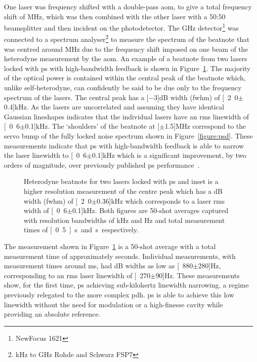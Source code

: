 One laser was frequency shifted with a double-pass \gls{aom}, to give a total frequency shift of \unit[160]{MHz}, which was then combined with the other laser with a 50:50 beamsplitter and then incident on the photodetector.
The \unit[1]{GHz} detector\footnote{NewFocus 1621} was connected to a spectrum analyser\footnote{\unit[9]{kHz} to \unit[7]{GHz} Rohde and Schwarz FSP7} to measure the spectrum of the beatnote that was centred around \unit[160]{MHz} due to the frequency shift imposed on one beam of the heterodyne measurement by the \gls{aom}.
An example of a beatnote from two lasers locked with \gls{ps} with high-bandwidth feedback is shown in Figure~\ref{figure:two_laser_beatnote}.
The majority of the optical power is contained within the central peak of the beatnote which, unlike self-heterodyne, can confidently be said to be due only to the frequency spectrum of the lasers.
The central peak has a \unit[$-3$]{dB} width (\gls{fwhm}) of \unit[2.0$\pm$0.4]{kHz}.
As the lasers are uncorrelated and assuming they have identical Gaussian lineshapes indicates that the individual lasers have an \gls{rms} linewidth of \unit[0.6$\pm$0.1]{kHz}.
The `shoulders' of the beatnote at \unit[$\pm$1.5]{MHz} correspond to the servo bump of the fully locked noise spectrum shown in Figure~\ref{figure:psd}.
These measurements indicate that \gls{ps} with high-bandwidth feedback is able to narrow the laser linewidth to \unit[0.6$\pm$0.1]{kHz} which is a significant improvement, by two orders of magnitude, over previously published \gls{ps} performance~\cite{torii_laser-phase_2012}.

\begin{figure}
\center

\caption[Heterodyne beatnote for two external cavity diode lasers locked with high-bandwidth polarisation spectroscopy.]{Heterodyne beatnote for two lasers locked with \gls{ps} and inset is a higher resolution measurement of the centre peak which has a \unit[-3]{dB} width (\gls{fwhm}) of \unit[2.0$\pm$0.36]{kHz} which corresponds to a laser \gls{rms} width of \unit[0.6$\pm$0.1]{kHz}.
Both figures are 50-shot averages captured with resolution bandwidths of \unit[30]{kHz} and \unit[100]{Hz} and total measurement times of \unit[0.5]{s} and \unit[2]{s} respectively.}
\label{figure:two_laser_beatnote}
\end{figure}

The measurement shown in Figure~\ref{figure:two_laser_beatnote} is a 50-shot average with a total measurement time of approximately \unit[2]{seconds}.
Individual measurements, with measurement times around \unit[40]{ms}, had \unit[-3]{dB} widths as low as \unit[880$\pm$280]{Hz}, corresponding to an \gls{rms} laser linewidth of \unit[270$\pm$90]{Hz}.
These measurements show, for the first time, \gls{ps} achieving sub-kilohertz linewidth narrowing, a regime previously relegated to the more complex \gls{pdh}.
\Gls{ps} is able to achieve this low linewidth without the need for modulation or a high-finesse cavity while providing an absolute reference.

